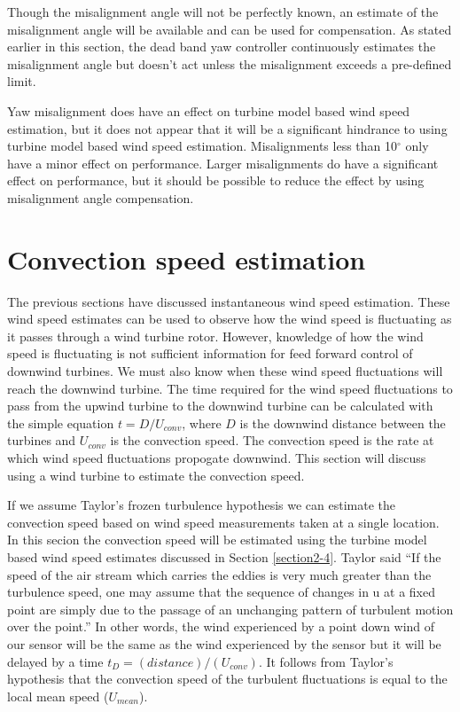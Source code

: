 Though the misalignment angle will not be perfectly known, an estimate of the misalignment angle will be available and can be used for compensation. As stated earlier in this section, the dead band yaw controller continuously estimates the misalignment angle but doesn’t act unless the misalignment exceeds a pre-defined limit. 

Yaw misalignment does have an effect on turbine model based wind speed estimation, but it does not appear that it will be a significant hindrance to using turbine model based wind speed estimation. Misalignments less than 10$^\circ$ only have a minor effect on performance. Larger misalignments do have a significant effect on performance, but it should be possible to reduce the effect by using misalignment angle compensation.






\section{Convection speed estimation} \label{section2-5}

The previous sections have discussed instantaneous wind speed estimation. These wind speed estimates can be used to observe how the wind speed is fluctuating as it passes through a wind turbine rotor. However, knowledge of how the wind speed is fluctuating is not sufficient information for feed forward control of downwind turbines. We must also know when these wind speed fluctuations will reach the downwind turbine. The time required for the wind speed fluctuations to pass from the upwind turbine to the downwind turbine can be calculated with the simple equation $t = D/U_{conv}$, where $D$ is the downwind distance between the turbines and $U_{conv}$ is the convection speed. The convection speed is the rate at which wind speed fluctuations propogate downwind. This section will discuss using a wind turbine to estimate the convection speed.

If we assume Taylor's frozen turbulence hypothesis we can estimate the convection speed based on wind speed measurements taken at a single location. In this secion the convection speed will be estimated using the turbine model based wind speed estimates discussed in Section \ref{section2-4}. Taylor said ``If the speed of the air stream which carries the eddies is very much greater than the turbulence speed, one may assume that the sequence of changes in u at a fixed point are simply due to the passage of an unchanging pattern of turbulent motion over the point.'' \cite{taylor1938} In other words, the wind experienced by a point down wind of our sensor will be the same as the wind experienced by the sensor but it will be delayed by a time $t_D = (distance)/(U_{conv})$. It follows from Taylor's hypothesis that the convection speed of the turbulent fluctuations is equal to the local mean speed ($U_{mean}$). 

